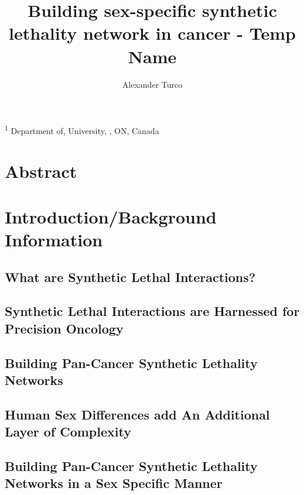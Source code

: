 \documentclass[10pt]{article}
\title{\sc Building sex-specific synthetic lethality network in cancer - Temp Name}
\author{\sc Alexander Turco}
\begin{document}

\onecolumn
                        \maketitle

\thispagestyle{empty}
\noindent \textsuperscript{1} Department of, University, , ON, Canada

\newpage
\tableofcontents %
\newpage
       
\section{Abstract} 

\newpage
\section{Introduction/Background Information}

	\subsection{What are Synthetic Lethal Interactions?}

	\subsection{Synthetic Lethal Interactions are Harnessed for Precision Oncology}

	\subsection{Building Pan-Cancer Synthetic Lethality Networks}

	\subsection{Human Sex Differences add An Additional Layer of Complexity}

	\subsection{Building Pan-Cancer Synthetic Lethality Networks in a Sex Specific Manner} 
\end{document}
